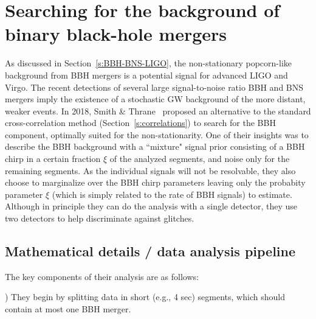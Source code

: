 \section{Searching for the background of binary black-hole
mergers}
\label{s:nonstationary}

As discussed in Section~\ref{s:BBH-BNS-LIGO}, the non-stationary 
popcorn-like background from BBH mergers is a potential signal 
for advanced LIGO and Virgo.
The recent detections of several large signal-to-noise ratio
BBH and BNS mergers imply the existence of a stochastic GW 
background of the more distant, weaker events.
In 2018, Smith \& Thrane~\cite{Smith-Thrane:2018} 
proposed an alternative to the standard cross-correlation 
method (Section~\ref{s:correlations})
to search for the BBH component, optimally suited for the non-stationarity.
One of their insights was to describe the BBH 
background with a ``mixture" signal prior consisting of
a BBH chirp in a certain fraction $\xi$ of the analyzed 
segments, and noise only for the remaining segments.
As the individual signals will not be resolvable, they also 
choose to marginalize over the BBH chirp parameters 
leaving only the probabity parameter $\xi$ (which is 
simply related to the rate of BBH signals) to estimate.
Although in principle they can do the analysis with a
single detector, they use two detectors to help 
discriminate against glitches.

\subsection{Mathematical details / data analysis pipeline}

The key components of their analysis are as follows:
\smallskip

) They begin by splitting data in short (e.g., 4 sec) segments, 
which should contain at most one BBH merger.

